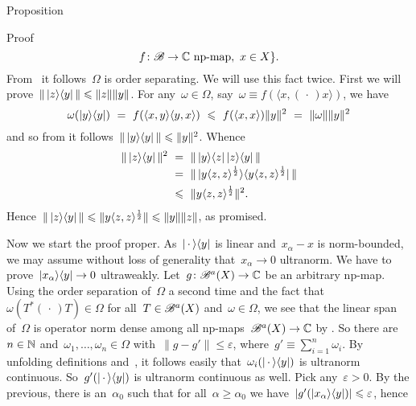 \begin{parsec}
\begin{point}{Proposition}
\begin{point}{Proof}
\begin{equation*}
    f \colon \mathscr{B} \to \mathbb{C} \text{ np-map},\ x \in X\}.
\end{equation*}
From~
    it follows~$\Omega$ is order separating.
We will use this fact twice.
First we will prove~$\| \left|z\right>\!\left<y\right| \| \leqslant \| z\| \|y\|$.
For any~$\omega \in \Omega$,
    say~$\omega \equiv f(\langle x,(\,\cdot\,) x \rangle)$, we have
\begin{equation*}
    \omega(\left|y\right>\!\left<y\right|)
     \ = \ f(\langle x,y \rangle\langle y, x \rangle) 
     \ \leqslant \ f(\langle x, x\rangle) \| y\|^2 
     \ = \ \| \omega \| \| y\|^2
\end{equation*}
and so from  it follows~$\| \left|y\right>\!\left<y\right| \| \leqslant \|y\|^2$. Whence
\begin{align*}
    \| \left|z\right>\!\left<y\right| \|^2
        & \ = \ \| \left|y\right>\!\left<z\right| \left|z\right>\!\left<y\right| \| \\
        & \ = \ \| \left|\smash{y \langle z,z\rangle^{\frac{1}{2}}}\right>\!\left<
\smash{y \langle z,z\rangle^{\frac{1}{2}}}\right| \| \\
        & \ \leqslant \ \| y \langle z,z \rangle^{\frac{1}{2}} \|^2.
\end{align*}
Hence~$\| \left|z\right>\!\left<y\right| \| \leqslant \|y \langle z,z\rangle^{\frac{1}{2}} \|
                            \leqslant \|y\|  \|z\|$, as promised.
\begin{point}%
Now we start the proof proper.
As~$\left|\,\cdot\,\right>\!\left<y\right|$ is linear
    and~$x_\alpha - x$ is norm-bounded,
    we may assume without loss of generality
    that~$x_\alpha \to 0$ ultranorm.
    We have to prove~$\left|x_\alpha\right>\!\left<y\right| \to 0$ ultraweakly.
Let~$g\colon \mathscr{B}^a(X) \to \mathbb{C}$ be an arbitrary np-map.
Using the order separation of~$\Omega$ a second time
        and the fact that~$\omega(T^* (\,\cdot\,)T) \in \Omega$
        for all~$T \in \mathscr{B}^a(X)$ and~$\omega \in \Omega$,
        we see that the linear span of~$\Omega$
    is operator norm dense among  all np-maps~$\mathscr{B}^a(X) \to \mathbb{C}$
    by .
So there are~$n \in \mathbb{N}$ and~$\omega_1, \ldots, \omega_n \in \Omega$
    with~$\| g - g' \| \leq \varepsilon$,
    where~$g' \equiv \sum^n_{i=1} \omega_i$.
By unfolding definitions and~,
    it follows easily that~$\omega_i(\left|\,\cdot\,\right>\!\left<y\right|)$
    is ultranorm continuous.
    So~$g'(\left|\,\cdot\,\right>\!\left<y\right|)$ is ultranorm continuous as well.
Pick any~$\varepsilon > 0$.
By the previous,
    there is an~$\alpha_0$ such that for all~$\alpha \geq \alpha_0$
    we have~$|g'(\left|x_\alpha\right>\!\left<y\right|)| \leqslant \varepsilon$,
    hence
\begin{align*}

\end{align*}
\end{point}
\end{point}
\end{point}
\end{parsec}
